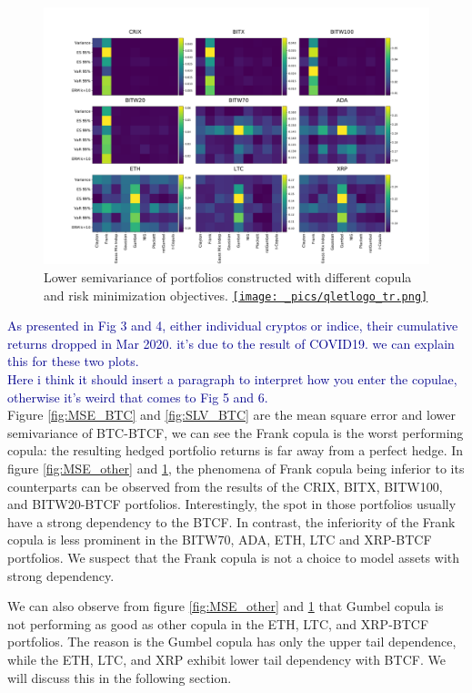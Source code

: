 \begin{figure}[th]
    \centering
    \includegraphics[width=\textwidth]{_pics/semiLowerVariance_other.pdf}
  \caption{Lower semivariance of portfolios constructed with different copula and risk minimization objectives.
  \href{http://www.quantlet.com/}{\texttt{[image: \_pics/qletlogo\_tr.png]}} }
\label{fig:SLV_other}
\end{figure}

\textcolor{darkblue}{As presented in Fig 3 and 4, either individual cryptos or indice, their cumulative returns dropped in Mar 2020. it's due to the result of COVID19. we can explain this for these two plots.}\\
\textcolor{darkblue}{Here i think it should insert a paragraph to interpret how you enter the copulae, otherwise it's weird that comes to Fig 5 and 6.}\\

Figure \ref{fig:MSE_BTC} and \ref{fig:SLV_BTC} are the mean square error and lower semivariance of BTC-BTCF, we can see the Frank copula is the worst performing copula:
the resulting hedged portfolio returns is far away from a perfect hedge.
In figure \ref{fig:MSE_other} and \ref{fig:SLV_other}, the phenomena of Frank copula being inferior to its counterparts can be observed from the results of the CRIX, BITX, BITW100, and BITW20-BTCF portfolios.
Interestingly, the spot in those portfolios usually have a strong dependency to the BTCF.
In contrast, the inferiority of the Frank copula is less prominent in the BITW70, ADA, ETH, LTC and XRP-BTCF portfolios.
We suspect that the Frank copula is not a choice to model assets with strong dependency.  \medskip

We can also observe from figure \ref{fig:MSE_other} and \ref{fig:SLV_other} that Gumbel copula is not performing as good as other copula in the ETH, LTC, and XRP-BTCF portfolios.
The reason is the Gumbel copula has only the upper tail dependence, while the ETH, LTC, and XRP exhibit lower tail dependency with BTCF.
We will discuss this in the following section. \medskip

